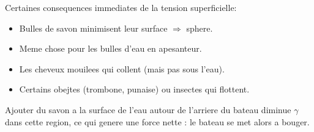 Certaines consequences immediates de la tension superficielle:
\begin{itemize}
\item Bulles de savon minimisent leur surface $\Rightarrow$ sphere.
\item Meme chose pour les bulles d'eau en apesanteur. 
\item Les cheveux mouilees qui collent (mais pas sous l'eau).
\item Certains obejtes (trombone, punaise) ou insectes qui flottent.
\end{itemize}
\begin{example}
Ajouter du savon a la surface de l’eau autour de l’arriere du bateau diminue $\gamma$ dans cette region,
ce qui genere une force nette : le bateau se met alors a bouger.
\end{example}
